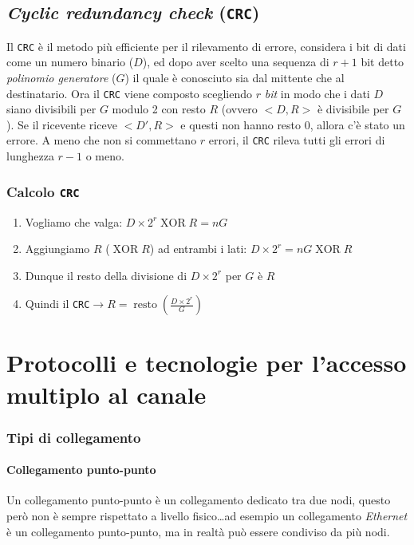     \subsection{\textit{Cyclic redundancy check} (\texttt{CRC})}
        Il \texttt{CRC} è il metodo più efficiente per il rilevamento di errore, considera i bit di dati come un numero binario ($D$), ed dopo aver scelto una sequenza di $r+1$ bit detto \textit{polinomio generatore} ($G$) il quale è conosciuto sia dal mittente che al destinatario. Ora il \texttt{CRC} viene composto scegliendo $r$ \textit{bit} in modo che i dati $D$ siano divisibili per $G$ modulo 2 con resto $R$ (ovvero $<D,R>$ è divisibile per $G$). Se il ricevente riceve $<D',R>$ e questi non hanno resto 0, allora c'è stato un errore. A meno che non si commettano $r$ errori, il \texttt{CRC} rileva tutti gli errori di lunghezza $r-1$ o meno.
        \subsubsection{Calcolo \texttt{CRC}}
            \begin{enumerate}
                \item Vogliamo che valga: $D\times 2^r \operatorname{XOR} R = nG$
                \item Aggiungiamo $R$ ($\operatorname{XOR} R$) ad entrambi i lati: $D\times 2^r = nG \operatorname{XOR} R$
                \item Dunque il resto della divisione di $D\times 2^r$ per $G$ è $R$
                \item Quindi il \texttt{CRC}$\rightarrow R=\operatorname{resto}\left(\frac{D\times 2^r}G\right)$
            \end{enumerate}
\section[Protocolli Accesso Multiplo Canale]{Protocolli e tecnologie per l'accesso multiplo al canale}
    \subsubsection{Tipi di collegamento}
        \paragraph{Collegamento punto-punto} Un collegamento punto-punto è un collegamento dedicato tra due nodi, questo però non è sempre rispettato a livello fisico\dots ad esempio un collegamento \textit{Ethernet} è un collegamento punto-punto, ma in realtà può essere condiviso da più nodi.
